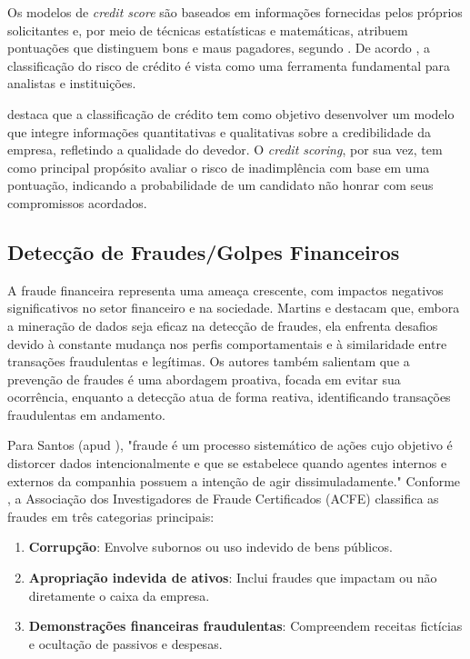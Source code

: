 \documentclass[12pt,a4paper]{article}
\begin{document}
Os modelos de \textit{credit score} são baseados em informações fornecidas pelos próprios solicitantes e, por meio de técnicas estatísticas e matemáticas, atribuem pontuações que distinguem bons e maus pagadores, segundo \cite{beserra2022}. De acordo \cite{francisco2012}, a classificação do risco de crédito é vista como uma ferramenta fundamental para analistas e instituições.

\cite{fuhr2022} destaca que a classificação de crédito tem como objetivo desenvolver um modelo que integre informações quantitativas e qualitativas sobre a credibilidade da empresa, refletindo a qualidade do devedor. O \textit{credit scoring}, por sua vez, tem como principal propósito avaliar o risco de inadimplência com base em uma pontuação, indicando a probabilidade de um candidato não honrar com seus compromissos acordados.

\subsection{Detecção de Fraudes/Golpes Financeiros}

A fraude financeira representa uma ameaça crescente, com impactos negativos significativos no setor financeiro e na sociedade. Martins e \cite{martins2022} destacam que, embora a mineração de dados seja eficaz na detecção de fraudes, ela enfrenta desafios devido à constante mudança nos perfis comportamentais e à similaridade entre transações fraudulentas e legítimas. Os autores também salientam que a prevenção de fraudes é uma abordagem proativa, focada em evitar sua ocorrência, enquanto a detecção atua de forma reativa, identificando transações fraudulentas em andamento.

Para Santos (apud \cite{soares2024}), "fraude é um processo sistemático de ações cujo objetivo é distorcer dados intencionalmente e que se estabelece quando agentes internos e externos da companhia possuem a intenção de agir dissimuladamente." Conforme \cite{soares2024}, a Associação dos Investigadores de Fraude Certificados (ACFE) classifica as fraudes em três categorias principais:
\begin{enumerate}
    \item \textbf{Corrupção}: Envolve subornos ou uso indevido de bens públicos.
    \item \textbf{Apropriação indevida de ativos}: Inclui fraudes que impactam ou não diretamente o caixa da empresa.
    \item \textbf{Demonstrações financeiras fraudulentas}: Compreendem receitas fictícias e ocultação de passivos e despesas.
\end{enumerate}
\end{document}
